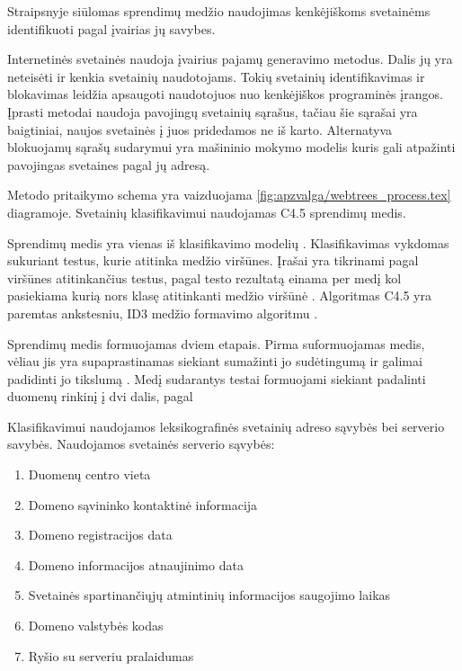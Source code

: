 
Straipsnyje  siūlomas sprendimų medžio naudojimas kenkėjiškoms svetainėms identifikuoti pagal įvairias jų savybes.


Internetinės svetainės naudoja įvairius pajamų generavimo metodus. Dalis jų yra neteisėti ir kenkia svetainių naudotojams. Tokių svetainių identifikavimas ir blokavimas leidžia apsaugoti naudotojuos nuo kenkėjiškos programinės įrangos. Įprasti metodai naudoja pavojingų svetainių sąrašus, tačiau šie sąrašai yra baigtiniai, naujos svetainės į juos pridedamos ne iš karto. Alternatyva blokuojamų sąrašų sudarymui yra mašininio mokymo modelis kuris gali atpažinti pavojingas svetaines pagal jų adresą.



Metodo pritaikymo schema yra vaizduojama \vref{fig:apzvalga/webtrees_process.tex} diagramoje. Svetainių klasifikavimui naudojamas C4.5 sprendimų medis.


Sprendimų medis yra vienas iš klasifikavimo modelių \cite{c45}. Klasifikavimas vykdomas sukuriant testus, kurie atitinka medžio viršūnes. Įrašai yra tikrinami pagal viršūnes atitinkančius testus, pagal testo rezultatą einama per medį kol pasiekiama kurią nors klasę atitinkanti medžio viršūnė \cite{trees}. Algoritmas C4.5 yra paremtas ankstesniu, ID3 medžio formavimo algoritmu .

Sprendimų medis formuojamas dviem etapais. Pirma suformuojamas medis, vėliau jis yra supaprastinamas siekiant sumažinti jo sudėtingumą ir galimai padidinti jo tikslumą \cite{c45}. Medį sudarantys testai formuojami siekiant padalinti duomenų rinkinį į dvi dalis, pagal



Klasifikavimui naudojamos leksikografinės svetainių adreso sąvybės bei serverio savybės. Naudojamos svetainės serverio sąvybės:
\begin{enumerate}[label=\arabic*.]
    \item Duomenų centro vieta
    \item Domeno sąvininko kontaktinė informacija
    \item Domeno registracijos data
    \item Domeno informacijos atnaujinimo data
    \item Svetainės spartinančiųjų atmintinių informacijos saugojimo laikas
    \item Domeno valstybės kodas
    \item Ryšio su serveriu pralaidumas
\end{enumerate}

